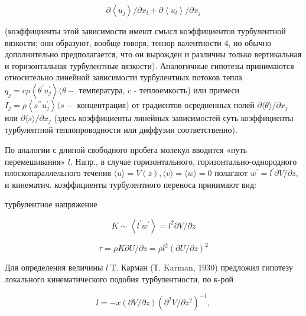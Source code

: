 \documentclass[10pt]{article}
\begin{document}
\[

\partial\left\langle u_{j}\right\rangle / \partial x_{l}+\partial\left\langle u_{l}\right\rangle / \partial x_{j}

\]



(коэффициенты этой зависимости имеют смысл коэффициентов турбулентной вязкости; они образуют, вообще говоря, тензор валентности 4, но обычно дополнительно предполагается, что он вырожден и различны только вертикальная и горизонтальная турбулентные вязкости). Аналогичные гипотезы принимаются относительно линейной зависимости турбулентных потоков тепла $q_{j}=c \rho\left\langle\theta^{\prime} u_{j}^{\prime}\right\rangle(\theta-$ температура, $c$ - теплоемкость) или примеси $I_{j}=\rho\left\langle s^{\prime \prime} u_{j}^{\prime}\right\rangle(s-$ концентрация) от градиентов осредненных полей $\partial\langle\theta\rangle / \partial x_{j}$ или $\partial\langle s\rangle / \partial x_{j}$ (здесь коэффициенты линейных зависимостей суть коэффициенты турбулентной теплопроводности или диффузии соответственно).



По аналогии с длиной свободного пробега молекул вводится «путь перемешивания» $l$. Напр., в случае горизонтального, горизонтально-однородного плоскопараллельного течения $\langle u\rangle=V(z),\langle v\rangle=\langle w\rangle=0$ полагают $w^{\prime}=l^{\prime} \partial V / \partial z$, и кинематич. коэффициенты турбулентного переноса принимают вид:



турбулентное напряжение



\[

K \sim\left\langle l^{\prime} w^{\prime}\right\rangle=l^{2} \partial V / \partial z

\]



\[

\tau=\rho K \partial U / \partial z=\rho l^{2}(\partial U / \partial z)^{2}

\]



Для определения величины $l \mathrm{~T}$. Карман (Т. Karman, 1930) предложил гипотезу локального кинематического подобия турбулентности, по к-рой



\[

l=-x(\partial V / \partial z)\left(\partial^{2} V / \partial z^{2}\right)^{-1},

\]
\end{document}
